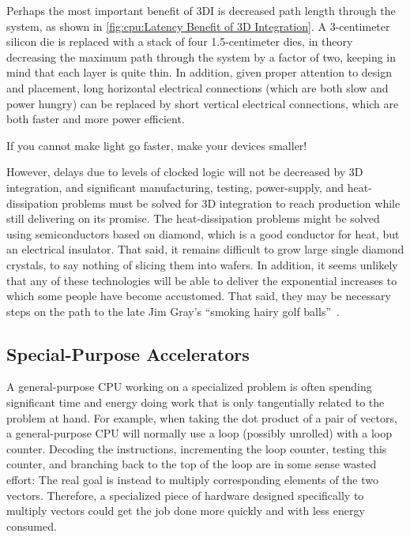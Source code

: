 Perhaps the most important benefit of 3DI is decreased path length through
the system, as shown in
\cref{fig:cpu:Latency Benefit of 3D Integration}.
A 3-centimeter silicon die is replaced with a stack of four 1.5-centimeter
dies, in theory decreasing the maximum path through the system by a factor
of two, keeping in mind that each layer is quite thin.
In addition, given proper attention to design and placement,
long horizontal electrical connections (which are both slow and
power hungry) can be replaced by short vertical electrical connections,
which are both faster and more power efficient.

If you cannot make light go faster, make your devices smaller!

However, delays due to levels of clocked logic will not be decreased
by 3D integration, and significant manufacturing, testing, power-supply,
and heat-dissipation problems must be solved for 3D integration to
reach production while still delivering on its promise.
The heat-dissipation problems might be solved using
semiconductors based on diamond, which is a good conductor
for heat, but an electrical insulator.
That said, it remains difficult to grow large single diamond crystals,
to say nothing of slicing them into wafers.
In addition, it seems unlikely that any of these technologies will be able to
deliver the exponential increases to which some people have become accustomed.
That said, they may be necessary steps on the path to the late Jim Gray's
``smoking hairy golf balls''~\cite{JimGray2002SmokingHairyGolfBalls}.

\subsection{Special-Purpose Accelerators}
\label{sec:cpu:Special-Purpose Accelerators}

A general-purpose CPU working on a specialized problem is often spending
significant time and energy doing work that is only tangentially related
to the problem at hand.
For example, when taking the dot product of a pair of vectors, a
general-purpose CPU will normally use a loop (possibly unrolled)
with a loop counter.
Decoding the instructions, incrementing the loop counter, testing this
counter, and branching back to the
top of the loop are in some sense wasted effort:
The real goal is instead to multiply corresponding elements of the
two vectors.
Therefore, a specialized piece of hardware designed specifically to
multiply vectors could get the job done more quickly and with less
energy consumed.

